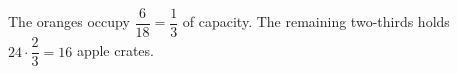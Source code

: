 The oranges occupy $\dfrac{6}{18}=\dfrac{1}{3}$ of capacity. The remaining two-thirds holds $24\cdot\dfrac{2}{3}=\boxed{16}$ apple crates.
